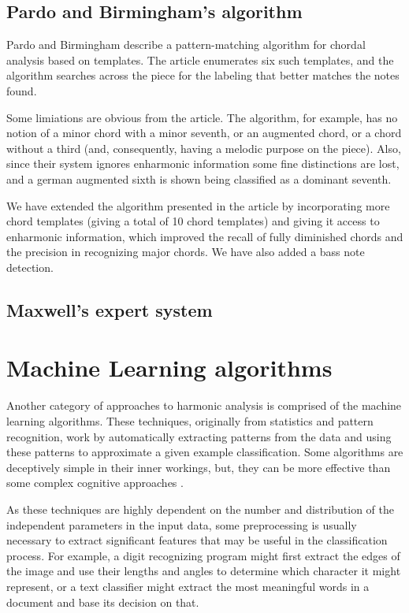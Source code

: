 \documentclass{article}
\begin{document}
\subsection{Pardo and Birmingham's algorithm}
\label{sec:pardo}

Pardo and Birmingham \cite{pardo.ea:algorithms} describe a
pattern-matching algorithm for chordal analysis based on
templates. The article enumerates six such templates, and the
algorithm searches across the piece for the labeling that better
matches the notes found.

Some limiations are obvious from the article. The algorithm, for
example, has no notion of a minor chord with a minor seventh, or an
augmented chord, or a chord without a third (and, consequently, having
a melodic purpose on the piece). Also, since their system ignores
enharmonic information some fine distinctions are lost, and a german
augmented sixth is shown being classified as a dominant seventh.

We have extended the algorithm presented in the article by
incorporating more chord templates (giving a total of 10 chord
templates) and giving it access to enharmonic information, which
improved the recall of fully diminished chords and the precision in
recognizing major chords. We have also added a bass note detection.

\subsection{Maxwell's expert system}
\label{sec:maxwell}



\section{Machine Learning algorithms}
\label{sec:stat-algor}

Another category of approaches to harmonic analysis is comprised of
the machine learning algorithms. These techniques, originally from
statistics and pattern recognition, work by automatically extracting
patterns from the data and using these patterns to approximate a given
example classification. Some algorithms are deceptively simple in
their inner workings, but, they can be more effective than some
complex cognitive approaches \cite{gomez.ea:estimating}.

As these techniques are highly dependent on the number and
distribution of the independent parameters in the input data, some
preprocessing is usually necessary to extract significant features
that may be useful in the classification process. For example, a digit
recognizing program might first extract the edges of the image and use
their lengths and angles to determine which character it might
represent, or a text classifier might extract the most meaningful
words in a document and base its decision on that.
\end{document}
